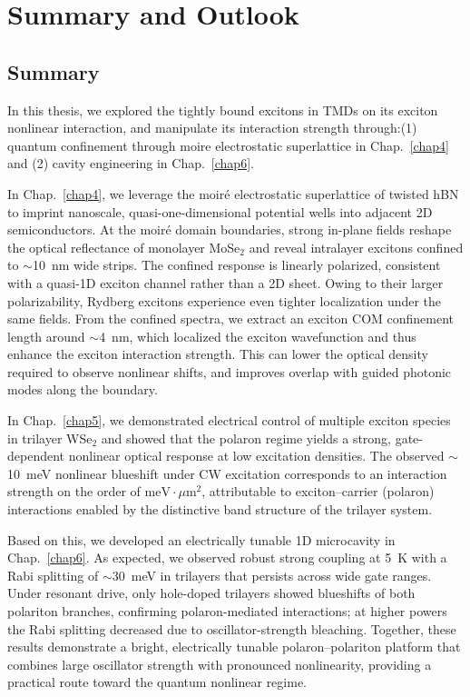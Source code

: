 
\renewcommand{\thechapter}{7}

\chapter{Summary and Outlook}
\label{chap7}
\section{Summary}

In this thesis, we explored the tightly bound excitons in TMDs on its exciton nonlinear interaction, and manipulate its interaction strength through:(1) quantum confinement through moire electrostatic superlattice in Chap.~\ref{chap4} and (2) cavity engineering in Chap.~\ref{chap6}. 

In Chap.~\ref{chap4}, we leverage the moiré electrostatic superlattice of twisted hBN to imprint nanoscale, quasi-one-dimensional potential wells into adjacent 2D semiconductors. 
At the moiré domain boundaries, strong in-plane fields reshape the optical reflectance of monolayer MoSe$_2$ and reveal intralayer excitons confined to $\sim$10~nm wide strips. 
The confined response is linearly polarized, consistent with a quasi-1D exciton channel rather than a 2D sheet. 
Owing to their larger polarizability, Rydberg excitons experience even tighter localization under the same fields. 
From the confined spectra, we extract an exciton COM confinement length around $\sim$4~nm, which localized the exciton wavefunction and thus enhance the exciton interaction strength.
This can lower the optical density required to observe nonlinear shifts, and improves overlap with guided photonic modes along the boundary. 

In Chap.~\ref{chap5}, we demonstrated electrical control of multiple exciton species in trilayer WSe$_2$ and showed that the polaron regime yields a strong, gate-dependent nonlinear optical response at low excitation densities. 
The observed $\sim$10~meV nonlinear blueshift under CW excitation corresponds to an interaction strength on the order of $\mathrm{meV}\!\cdot\!\mu\mathrm{m}^2$, attributable to exciton–carrier (polaron) interactions enabled by the distinctive band structure of the trilayer system.

Based on this, we developed an electrically tunable 1D microcavity in Chap.~\ref{chap6}. 
As expected, we observed robust strong coupling at 5~K with a Rabi splitting of $\sim$30~meV in trilayers that persists across wide gate ranges. 
Under resonant drive, only hole-doped trilayers showed blueshifts of both polariton branches, confirming polaron-mediated interactions; at higher powers the Rabi splitting decreased due to oscillator-strength bleaching. 
Together, these results demonstrate a bright, electrically tunable polaron–polariton platform that combines large oscillator strength with pronounced nonlinearity, providing a practical route toward the quantum nonlinear regime.

